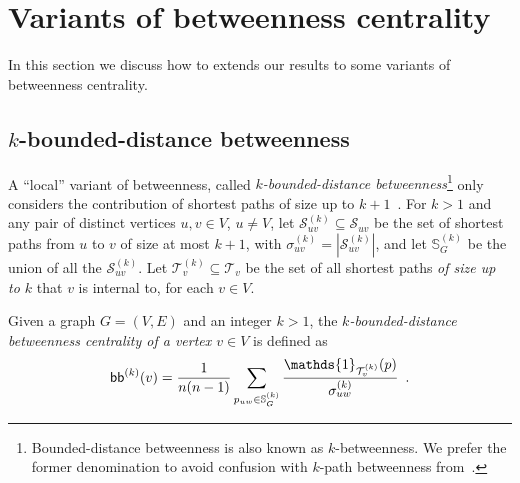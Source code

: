 \ifproof
\section{Variants of betweenness centrality}\label{sec:centrsamplvariants}
In this section we discuss how to extends our results to some variants of
betweenness centrality.

\subsection{$k$-bounded-distance betweenness}
A ``local'' variant of betweenness, called \emph{$k$-bounded-distance
betweenness}\footnote{Bounded-distance betweenness is also known as
$k$-betweenness. We prefer the former denomination to avoid confusion with
$k$-path betweenness from~\citep{KourtellisASIT12}.} only considers
the contribution of shortest paths of size up to $k+1$~\citep{BorgattiE06,Brandes08}.
For $k>1$ and any pair of distinct vertices $u,v\in V$, $u\neq V$, let
$\mathcal{S}^{(k)}_{uv}\subseteq\mathcal{S}_{uv}$ be the set of shortest paths
from $u$ to $v$ of size at most $k+1$, with
$\sigma^{(k)}_{uv}=|\mathcal{S}^{(k)}_{uv}|$, and let $\mathbb{S}^{(k)}_G$ be the
union of all the $\mathcal{S}^{(k)}_{uv}$. Let
$\mathcal{T}^{(k)}_v\subseteq\mathcal{T}_v$ be the set of all shortest paths
\emph{of size up to $k$} that $v$ is internal to, for each $v\in V$.

\begin{definition}\label{def:centrsamplkboundbetweenness}
  \citep{BorgattiE06,Brandes08} Given a graph $G=(V,E)$ and an integer $k>1$,
  the \emph{$k$-bounded-distance betweenness centrality of a vertex $v\in V$} is
  defined as
  \[
  \kboundbetw^{(k)}(v)=\frac{1}{n(n-1)}\sum_{p_{uw}\in\mathbb{S}^{(k)}_G}\frac{\mathds{1}_{\mathcal{T}^{(k)}_v}(p)}{\sigma^{(k)}_{uw}}
  \enspace.
  \]
\end{definition}

